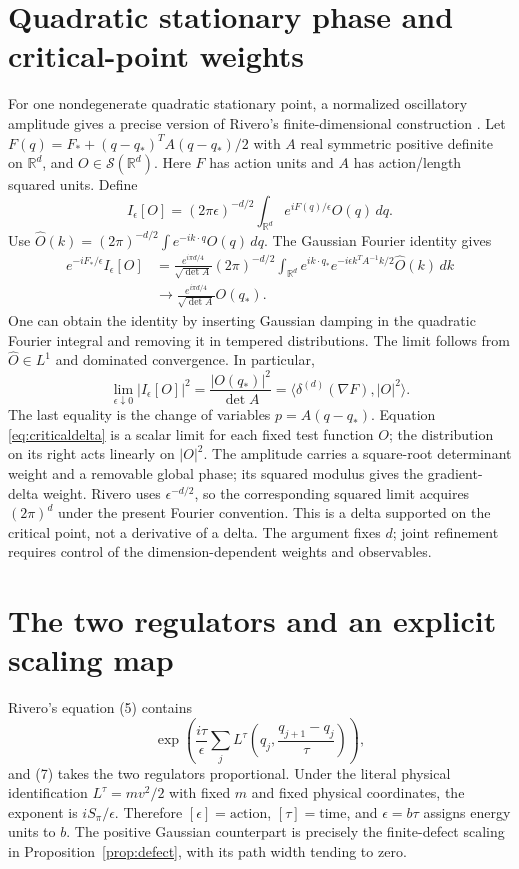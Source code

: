 \documentclass[11pt,a4paper]{article}
\newcommand{\R}{\mathbb R}
\begin{document}
\section{Quadratic stationary phase and critical-point weights}\label{sec:phase}
For one nondegenerate quadratic stationary point, a normalized oscillatory
amplitude gives a precise version of Rivero's finite-dimensional construction
\cite[p.~1, (2)--(4)]{RiveroFeynman1998}. Let
$F(q)=F_*+(q-q_*)^TA(q-q_*)/2$ with $A$ real symmetric positive definite on
$\R^d$, and $O\in\mathcal S(\R^d)$. Here $F$ has action units and $A$
has action/length squared units. Define
\[
 I_\epsilon[O]=(2\pi\epsilon)^{-d/2}
 \int_{\R^d}e^{iF(q)/\epsilon}O(q)\,dq.
\]
Use $\widehat O(k)=(2\pi)^{-d/2}\int e^{-ik\cdot q}O(q)\,dq$.
The Gaussian Fourier identity \cite[p.~464, (14.7)]{GuilleminSternberg2010} gives
\begin{align*}
 e^{-iF_*/\epsilon}I_\epsilon[O]
 &=\frac{e^{i\pi d/4}}{\sqrt{\det A}}(2\pi)^{-d/2}
 \int_{\R^d}e^{ik\cdot q_*}
 e^{-i\epsilon k^TA^{-1}k/2}\widehat O(k)\,dk\\
 &\longrightarrow\frac{e^{i\pi d/4}}{\sqrt{\det A}}O(q_*).
\end{align*}
One can obtain the identity by inserting Gaussian damping in the quadratic
Fourier integral and removing it in tempered distributions. The limit follows
from $\widehat O\in L^1$ and dominated convergence. In particular,
\begin{equation}\label{eq:criticaldelta}
 \lim_{\epsilon\downarrow0}|I_\epsilon[O]|^2
 =\frac{|O(q_*)|^2}{\det A}
 =\langle\delta^{(d)}(\nabla F),|O|^2\rangle.
\end{equation}
The last equality is the change of variables $p=A(q-q_*)$.
Equation \eqref{eq:criticaldelta} is a scalar limit for each fixed test
function $O$; the distribution on its right acts linearly on $|O|^2$.
The amplitude carries a square-root determinant weight and a removable global
phase; its squared modulus gives the gradient-delta weight. Rivero uses
$\epsilon^{-d/2}$, so the corresponding squared limit acquires $(2\pi)^d$
under the present Fourier convention. This is a delta supported on the
critical point, not a derivative of a delta. The argument fixes $d$; joint
refinement requires control of the dimension-dependent weights and observables.

\section{The two regulators and an explicit scaling map}\label{sec:map}
Rivero's equation (5) contains
\[
 \exp\left(\frac{i\tau}{\epsilon}
 \sum_j L^\tau\!\left(q_j,\frac{q_{j+1}-q_j}{\tau}\right)\right),
\]
and (7) takes the two regulators proportional. Under the literal physical
identification $L^\tau=mv^2/2$ with fixed $m$ and fixed physical coordinates,
the exponent is $iS_\pi/\epsilon$. Therefore $[\epsilon]=\text{action}$,
$[\tau]=\text{time}$, and $\epsilon=b\tau$ assigns energy units to $b$.
The positive Gaussian counterpart is precisely the finite-defect scaling in
Proposition~\ref{prop:defect}, with its path width tending to zero.
\end{document}
